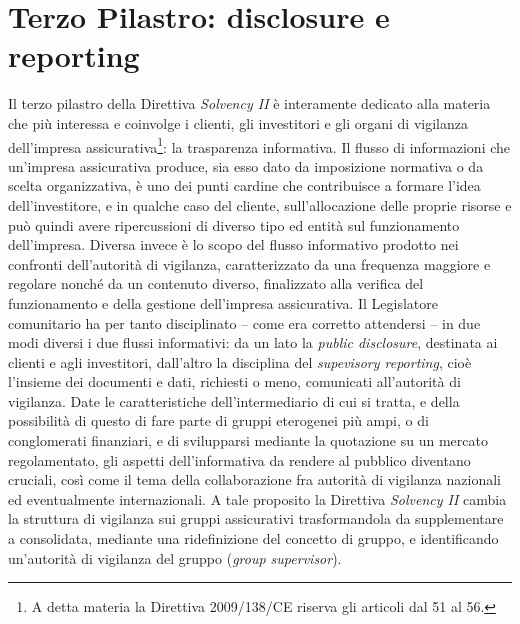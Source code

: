 \section{Terzo Pilastro: disclosure e reporting}
Il terzo pilastro della Direttiva \textit{\textit{Solvency I}I} è interamente dedicato alla materia che più interessa e coinvolge i clienti, gli investitori e gli organi di vigilanza dell’impresa assicurativa\footnote{A detta materia la Direttiva 2009/138/CE riserva gli articoli dal 51 al 56.}: la trasparenza informativa.
Il flusso di informazioni che un’impresa assicurativa produce, sia esso dato da imposizione normativa o da scelta organizzativa, è uno dei punti cardine che contribuisce a formare l’idea dell’investitore, e in qualche caso del cliente, sull’allocazione delle proprie risorse e può quindi avere ripercussioni di diverso tipo ed entità sul funzionamento dell’impresa. Diversa invece è lo scopo del flusso informativo prodotto nei confronti dell’autorità di vigilanza, caratterizzato da una frequenza maggiore e regolare nonché da un contenuto diverso, finalizzato alla verifica del funzionamento e della gestione dell’impresa assicurativa.
Il Legislatore comunitario ha per tanto disciplinato – come era corretto attendersi – in due modi diversi i due flussi informativi: da un lato la {\itshape public disclosure}, destinata ai clienti e agli investitori, dall’altro la disciplina del {\itshape supevisory reporting}, cioè l’insieme dei documenti e dati, richiesti o meno, comunicati all’autorità di vigilanza.
Date le caratteristiche dell’intermediario di cui si tratta, e della possibilità di questo di fare parte di gruppi eterogenei più ampi, o di conglomerati finanziari, e di svilupparsi mediante la quotazione su un mercato regolamentato, gli aspetti dell’informativa da rendere al pubblico diventano cruciali, così come il tema della collaborazione fra autorità di vigilanza nazionali ed eventualmente internazionali. A tale proposito la Direttiva \textit{\textit{Solvency I}I} cambia la struttura di vigilanza sui gruppi assicurativi trasformandola da supplementare a consolidata, mediante una ridefinizione del concetto di gruppo, e identificando un’autorità di vigilanza del gruppo ({\itshape group supervisor}).

